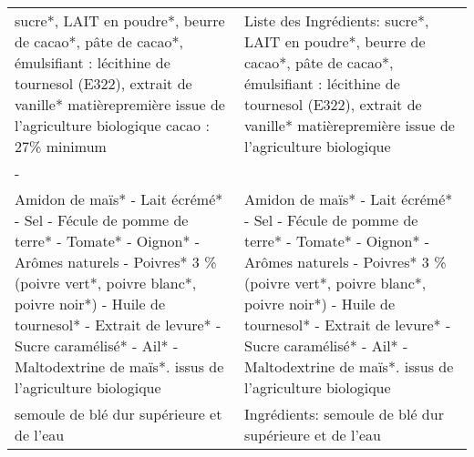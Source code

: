 \begin{longtable}{p{7cm}p{7cm}}
\bottomrule
\endlastfoot
                                                                                                 sucre*, LAIT en poudre*, beurre de cacao*, pâte de cacao*, émulsifiant : lécithine de tournesol (E322), extrait de \newline vanille* \newline * matièrepremière issue de l'agriculture biologique \newline cacao : 27\% minimum &                                                                                            Liste des Ingrédients: \newline sucre*,  LAIT en poudre*,  beurre de cacao*,  pâte de cacao*,  émulsifiant : lécithine de tournesol (E322),  extrait de  \newline vanille* \newline * matièrepremière issue de l'agriculture biologique \\
                                                                                                                                                                                                                                                                                                      - &                                                                                                                                                                                                                                                                                                           \\
 Amidon de maïs* - Lait écrémé* - Sel - Fécule de pomme de terre* - Tomate* - Oignon* - Arômes naturels - Poivres* 3 \% (poivre vert*, poivre blanc*, poivre noir*) - Huile de tournesol* - Extrait de levure* - Sucre caramélisé* - Ail* - Maltodextrine de maïs*. \newline * issus de l'agriculture biologique &  Amidon de maïs* - Lait écrémé* - Sel - Fécule de pomme de terre* - Tomate* - Oignon* - Arômes naturels - Poivres* 3 \% (poivre vert*, poivre blanc*,  \newline poivre noir*) - Huile de tournesol* - Extrait de levure* - Sucre caramélisé* - Ail* - Maltodextrine de maïs*.  \newline * issus de l’agriculture biologique \\
                                                                                                                                                                                                                                                              semoule de blé dur supérieure et de l'eau &                                                                                                                                                                                                                                                    Ingrédients: semoule de blé dur supérieure et de l'eau  \\

\end{longtable}
